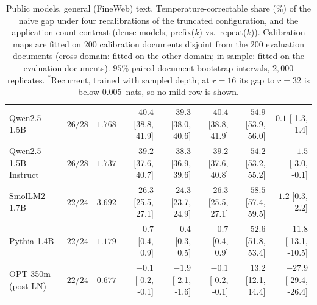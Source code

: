 \begin{table}[t]
\begin{tabular}{llrrrrrr}
Qwen2.5-1.5B & $26/28$ & $1.768$ & $40.4$ {\tiny[38.8, 41.9]} & $39.3$ {\tiny[38.0, 40.6]} & $40.4$ {\tiny[38.8, 41.9]} & $54.9$ {\tiny[53.9, 56.0]} & $0.1$ {\tiny[-1.3, 1.4]} \\
Qwen2.5-1.5B-Instruct & $26/28$ & $1.737$ & $39.2$ {\tiny[37.6, 40.7]} & $38.3$ {\tiny[36.9, 39.6]} & $39.2$ {\tiny[37.6, 40.8]} & $54.2$ {\tiny[53.2, 55.2]} & $-1.5$ {\tiny[-3.0, -0.1]} \\
SmolLM2-1.7B & $22/24$ & $3.692$ & $26.3$ {\tiny[25.5, 27.1]} & $24.3$ {\tiny[23.7, 24.9]} & $26.3$ {\tiny[25.5, 27.1]} & $58.5$ {\tiny[57.4, 59.5]} & $1.2$ {\tiny[0.3, 2.2]} \\
Pythia-1.4B & $22/24$ & $1.179$ & $0.7$ {\tiny[0.4, 0.9]} & $0.4$ {\tiny[0.3, 0.5]} & $0.7$ {\tiny[0.4, 0.9]} & $52.6$ {\tiny[51.8, 53.4]} & $-11.8$ {\tiny[-13.1, -10.5]} \\
OPT-350m (post-LN) & $22/24$ & $0.677$ & $-0.1$ {\tiny[-0.2, -0.1]} & $-1.9$ {\tiny[-2.1, -1.6]} & $-0.1$ {\tiny[-0.2, -0.1]} & $13.2$ {\tiny[12.1, 14.4]} & $-27.9$ {\tiny[-29.4, -26.4]} \\
\bottomrule
\end{tabular}
\caption{Public models, general (FineWeb) text. Temperature-correctable share (\%) of the naive gap under four recalibrations of the truncated configuration, and the application-count contrast (dense models, prefix($k$) vs.\ repeat($k$)). Calibration maps are fitted on $200$ calibration documents disjoint from the $200$ evaluation documents (cross-domain: fitted on the other domain; in-sample: fitted on the evaluation documents). $95\%$ paired document-bootstrap intervals, $2{,}000$ replicates. $^{\ast}$Recurrent, trained with sampled depth; at $r = 16$ its gap to $r = 32$ is below $0.005$~nats, so no mild row is shown.}
\label{tab:public-web}
\end{table}

